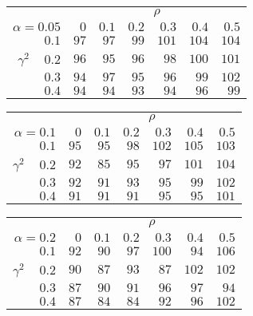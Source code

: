 \begin{tabular}{r|rrrrrr}
\hline\hline
 &\multicolumn{6}{c}{$\rho$} \\ 
 $\alpha = 0.05$ & $0$ & $0.1$ & $0.2$ & $0.3$ & $0.4$ & $0.5$ \\ 
 \hline$0.1$ & $ 97$ & $ 97$ & $ 99$ & $101$ & $104$ & $104$\\ 
$\gamma^2\;\;\;$ $0.2$ & $ 96$ & $ 95$ & $ 96$ & $ 98$ & $100$ & $101$\\ 
$0.3$ & $ 94$ & $ 97$ & $ 95$ & $ 96$ & $ 99$ & $102$\\ 
$0.4$ & $ 94$ & $ 94$ & $ 93$ & $ 94$ & $ 96$ & $ 99$\\ 
 \hline 
 \end{tabular}
 
 \vspace{2em} 
 
\begin{tabular}{r|rrrrrr}
\hline\hline
 &\multicolumn{6}{c}{$\rho$} \\ 
 $\alpha = 0.1$ & $0$ & $0.1$ & $0.2$ & $0.3$ & $0.4$ & $0.5$ \\ 
 \hline$0.1$ & $ 95$ & $ 95$ & $ 98$ & $102$ & $105$ & $103$\\ 
$\gamma^2\;\;\;$ $0.2$ & $ 92$ & $ 85$ & $ 95$ & $ 97$ & $101$ & $104$\\ 
$0.3$ & $ 92$ & $ 91$ & $ 93$ & $ 95$ & $ 99$ & $102$\\ 
$0.4$ & $ 91$ & $ 91$ & $ 91$ & $ 95$ & $ 95$ & $101$\\ 
 \hline 
 \end{tabular}
 
 \vspace{2em} 
 
\begin{tabular}{r|rrrrrr}
\hline\hline
 &\multicolumn{6}{c}{$\rho$} \\ 
 $\alpha = 0.2$ & $0$ & $0.1$ & $0.2$ & $0.3$ & $0.4$ & $0.5$ \\ 
 \hline$0.1$ & $ 92$ & $ 90$ & $ 97$ & $100$ & $ 94$ & $106$\\ 
$\gamma^2\;\;\;$ $0.2$ & $ 90$ & $ 87$ & $ 93$ & $ 87$ & $102$ & $102$\\ 
$0.3$ & $ 87$ & $ 90$ & $ 91$ & $ 96$ & $ 97$ & $ 94$\\ 
$0.4$ & $ 87$ & $ 84$ & $ 84$ & $ 92$ & $ 96$ & $102$\\ 
 \hline 
 \end{tabular}